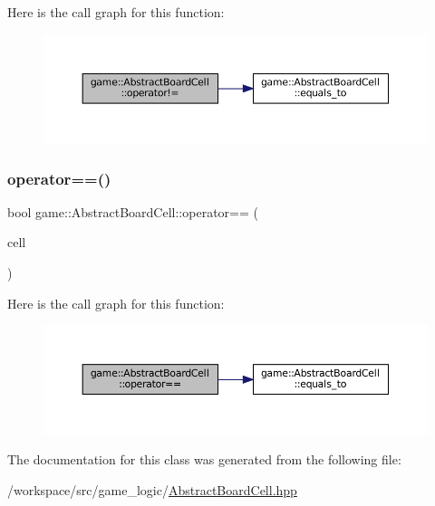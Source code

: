 Here is the call graph for this function\+:
\nopagebreak
\begin{figure}[H]
\begin{center}
\leavevmode
\includegraphics[width=350pt]{classgame_1_1_abstract_board_cell_a4a649f51a349dad0246fed9e8faee922_cgraph}
\end{center}
\end{figure}
\mbox{\label{classgame_1_1_abstract_board_cell_ad2e86ef567d46428275e9eb4372d788f}} 
\subsubsection{\texorpdfstring{operator==()}{operator==()}}
{\footnotesize\ttfamily bool game\+::\+Abstract\+Board\+Cell\+::operator== (\begin{DoxyParamCaption}\item[{const \hyperlink{classgame_1_1_abstract_board_cell}{Abstract\+Board\+Cell} \&}]{cell }\end{DoxyParamCaption})\hspace{0.3cm}{\ttfamily [inline]}}

Here is the call graph for this function\+:
\nopagebreak
\begin{figure}[H]
\begin{center}
\leavevmode
\includegraphics[width=350pt]{classgame_1_1_abstract_board_cell_ad2e86ef567d46428275e9eb4372d788f_cgraph}
\end{center}
\end{figure}


The documentation for this class was generated from the following file\+:\begin{DoxyCompactItemize}
\item 
/workspace/src/game\+\_\+logic/\hyperlink{_abstract_board_cell_8hpp}{Abstract\+Board\+Cell.\+hpp}\end{DoxyCompactItemize}
